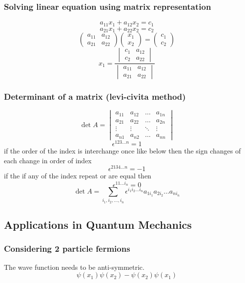 \documentclass[12pt, a4paper]{report}
\begin{document}
\subsubsection{Solving linear equation using matrix representation}
$$
a_{11}x_1+a_{12}x_2 = c_1
$$
$$
a_{21}x_1+a_{22}x_2 = c_2
$$
$$
\begin{pmatrix}
a_{11} & a_{12} \\
a_{21} & a_{22}
\end{pmatrix}
\begin{pmatrix}
x_1 \\ x_2
\end{pmatrix}
=
\begin{pmatrix}
c_1 \\ c_2
\end{pmatrix}
$$
$$
x_1 = \frac{
\begin{vmatrix}
c_1 & a_{12} \\
c_2 & a_{22}
\end{vmatrix}
}{
\begin{vmatrix}
a_{11} & a_{12} \\
a_{21} & a_{22}
\end{vmatrix}
}
$$
\subsubsection{Determinant of a matrix (levi-civita method)}
$$
\det A =
\begin{vmatrix}
a_{11} & a_{12} & \dots & a_{1n} \\
a_{21} & a_{22} & \dots & a_{2n} \\
\vdots & \vdots & \ddots & \vdots \\
a_{n1} & a_{n2} & \dots & a_{nn}
\end{vmatrix}
$$
$$
\epsilon^{123\dots n} = 1
$$
if the order of the index is interchange once like below then the sign changes of each change in order of index 
$$
\epsilon^{2134\dots n} = -1
$$
if the if any of the index repeat or are equal then
$$\epsilon^{11\dots i_n} = 0 $$
$$
\det A = \sum_{i_1, i_2, \dots, i_n} \epsilon^{i_1 i_2 \dots i_n} a_{1 i_1} a_{2 i_2} \dots a_{n i_n}
$$

\subsection{Applications in Quantum Mechanics}
\subsubsection{Considering 2 particle fermions}
The wave function needs to be anti-symmetric.
$$
\psi(x_1) \psi(x_2) - \psi(x_2) \psi(x_1)
$$
\end{document}
